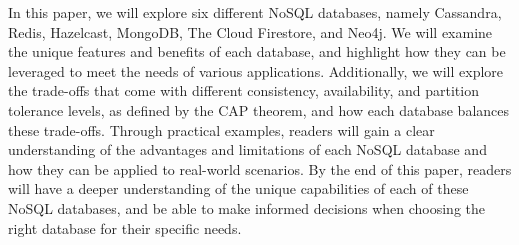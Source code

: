In this paper, we will explore six different NoSQL databases, namely Cassandra,
Redis, Hazelcast, MongoDB, The Cloud Firestore, and Neo4j. We will examine the
unique features and benefits of each database, and highlight how they can be
leveraged to meet the needs of various applications. Additionally, we will
explore the trade-offs that come with different consistency, availability, and
partition tolerance levels, as defined by the CAP theorem, and how each database
balances these trade-offs. Through practical examples, readers will gain a clear
understanding of the advantages and limitations of each NoSQL database and how
they can be applied to real-world scenarios. By the end of this paper, readers
will have a deeper understanding of the unique capabilities of each of these
NoSQL databases, and be able to make informed decisions when choosing the right
database for their specific needs.